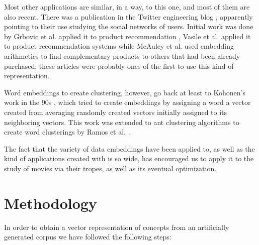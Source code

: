 \documentclass[letterpaper]{article}
\begin{document}
	Most other applications are similar, in a way, to this one,
	and most of them are also recent. There was a publication in
	the Twitter engineering blog \cite{twitter:embeddings},
	apparently pointing to their use studying the social networks
	of users. Initial work was done by Grbovic et al. applied it to product recommendation
	\cite{Grbovic2015}, Vasile et al. applied it to product
	recommendation systems \cite{vasile2016} while McAuley et
	al. \cite{DBLP:journals/corr/McAuleyPL15} used embedding
	arithmetics to find complementary products to others that had
	been already purchased; these articles were
	probably ones of the first to use this kind of
	representation.
	
	Word embeddings to create clustering, however, go back at
	least to Kohonen's work in the 90s
	\cite{kohonen1997exploration}, which tried to create
	embeddings by assigning a word a vector created from averaging
	randomly created vectors initially assigned to its neighboring
	vectors. This work was extended to ant clustering algorithms
	to create word clusterings by Ramos et
	al. \cite{DBLP:journals/corr/abs-cs-0412075}.
	
	The fact that the variety of data embeddings have been applied
	to, as well as the kind of applications created with is so
	wide, has encouraged us to apply it to the study of movies via
	their tropes, as well as its eventual optimization.
	
	\section{Methodology}
	\label{sec:met}
	
	In order to obtain a vector representation of concepts from an artificially generated corpus we have followed the following steps:
	
\end{document}
